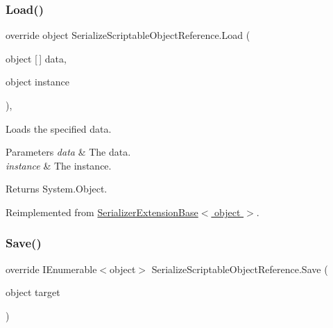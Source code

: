 \mbox{\label{class_serialize_scriptable_object_reference_a83057b58f36e559106c518db722a8b81}} 
\subsubsection{\texorpdfstring{Load()}{Load()}}
{\footnotesize\ttfamily override object Serialize\+Scriptable\+Object\+Reference.\+Load (\begin{DoxyParamCaption}\item[{object \mbox{[}$\,$\mbox{]}}]{data,  }\item[{object}]{instance }\end{DoxyParamCaption})\hspace{0.3cm}{\ttfamily [inline]}, {\ttfamily [virtual]}}



Loads the specified data. 


\begin{DoxyParams}{Parameters}
{\em data} & The data.\\
\hline
{\em instance} & The instance.\\
\hline
\end{DoxyParams}
\begin{DoxyReturn}{Returns}
System.\+Object.
\end{DoxyReturn}


Reimplemented from \hyperlink{class_serializer_extension_base_a3792a9b27056e30ca0ac91531936ae47}{Serializer\+Extension\+Base$<$ object $>$}.

\mbox{\label{class_serialize_scriptable_object_reference_a5356a3b70d63530dfa62962144c23ff5}} 
\subsubsection{\texorpdfstring{Save()}{Save()}}
{\footnotesize\ttfamily override I\+Enumerable$<$object$>$ Serialize\+Scriptable\+Object\+Reference.\+Save (\begin{DoxyParamCaption}\item[{object}]{target }\end{DoxyParamCaption})\hspace{0.3cm}{\ttfamily [inline]}}



